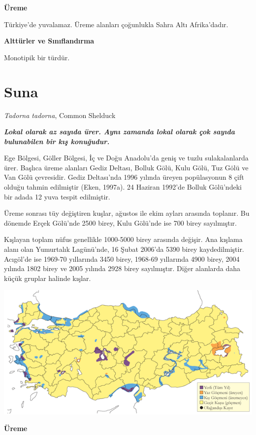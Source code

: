 \documentclass[
  a4paper,
  DIV=11,
  numbers=noendperiod]{scrreprt}
\begin{document}
\textbf{Üreme}

Türkiye'de yuvalamaz. Üreme alanları çoğunlukla Sahra Altı Afrika'dadır.

\textbf{Alttürler ve Sınıflandırma}

Monotipik bir türdür.

\section{Suna}\label{suna}

\emph{Tadorna tadorna}, Common Shelduck

\textbf{\emph{Lokal olarak az sayıda ürer. Aynı zamanda lokal olarak çok
sayıda bulunabilen bir kış konuğudur.}}

Ege Bölgesi, Göller Bölgesi, İç ve Doğu Anadolu'da geniş ve tuzlu
sulakalanlarda ürer. Başlıca üreme alanları Gediz Deltası, Bolluk Gölü,
Kulu Gölü, Tuz Gölü ve Van Gölü çevresidir. Gediz Deltası'nda 1996
yılında üreyen popülasyonun 8 çift olduğu tahmin edilmiştir (Eken,
1997a). 24 Haziran 1992'de Bolluk Gölü'ndeki bir adada 12 yuva tespit
edilmiştir.

Üreme sonrası tüy değiştiren kuşlar, ağustos ile ekim ayları arasında
toplanır. Bu dönemde Erçek Gölü'nde 2500 birey, Kulu Gölü'nde ise 700
birey sayılmıştır.

Kışlayan toplam nüfus genellikle 1000-5000 birey arasında değişir. Ana
kışlama alanı olan Yumurtalık Lagünü'nde, 16 Şubat 2006'da 5390 birey
kaydedilmiştir. Acıgöl'de ise 1969-70 yıllarında 3450 birey, 1968-69
yıllarında 4900 birey, 2004 yılında 1802 birey ve 2005 yılında 2928
birey sayılmıştır. Diğer alanlarda daha küçük gruplar halinde kışlar.

\includegraphics{images/harita_Page_012.png}

\textbf{Üreme}
\end{document}
